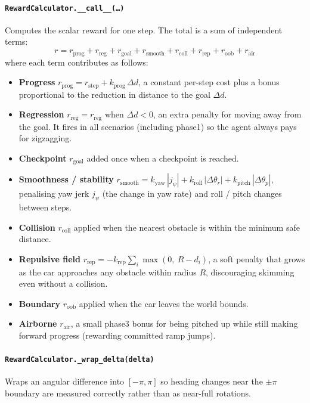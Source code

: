 \documentclass[11pt]{article}
\begin{document}
\paragraph{\texttt{RewardCalculator.\_\_call\_\_(\dots)}}
Computes the scalar reward for one step. The total is a sum of independent
terms:
\[
r = r_{\text{prog}} + r_{\text{reg}} + r_{\text{goal}} + r_{\text{smooth}}
  + r_{\text{coll}} + r_{\text{rep}} + r_{\text{oob}} + r_{\text{air}}
\]
where each term contributes as follows:
\begin{itemize}
  \item \textbf{Progress} $r_{\text{prog}} = r_{\text{step}} + k_{\text{prog}}\,\Delta d$,
        a constant per-step cost plus a bonus proportional to the reduction in
        distance to the goal $\Delta d$.
  \item \textbf{Regression} $r_{\text{reg}} = r_{\text{reg}}$ when $\Delta d < 0$,
        an extra penalty for moving away from the goal. It fires in all
        scenarios (including phase1) so the agent always pays for zigzagging.
  \item \textbf{Checkpoint} $r_{\text{goal}}$ added once when a checkpoint is
        reached.
  \item \textbf{Smoothness / stability}
        $r_{\text{smooth}} = k_{\text{yaw}}\,|j_\psi|
         + k_{\text{roll}}\,|\Delta\theta_r| + k_{\text{pitch}}\,|\Delta\theta_p|$,
        penalising yaw jerk $j_\psi$ (the change in yaw rate) and roll / pitch
        changes between steps.
  \item \textbf{Collision} $r_{\text{coll}}$ applied when the nearest obstacle
        is within the minimum safe distance.
  \item \textbf{Repulsive field}
        $r_{\text{rep}} = -k_{\text{rep}} \sum_i \max(0,\ R - d_i)$,
        a soft penalty that grows as the car approaches any obstacle within
        radius $R$, discouraging skimming even without a collision.
  \item \textbf{Boundary} $r_{\text{oob}}$ applied when the car leaves the
        world bounds.
  \item \textbf{Airborne} $r_{\text{air}}$, a small phase3 bonus for being
        pitched up while still making forward progress (rewarding committed
        ramp jumps).
\end{itemize}

\paragraph{\texttt{RewardCalculator.\_wrap\_delta(delta)}}
Wraps an angular difference into $[-\pi, \pi]$ so heading changes near the
$\pm\pi$ boundary are measured correctly rather than as near-full rotations.
\end{document}
